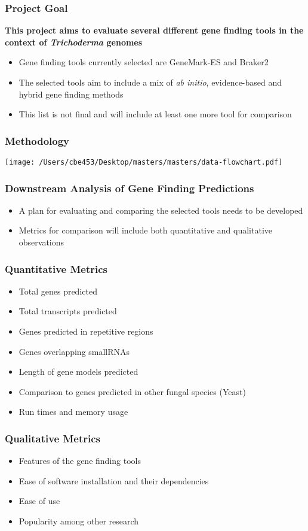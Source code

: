 \documentclass{beamer}
\begin{document}
\begin{frame}
  \frametitle{Project Goal} \textbf{This project aims to evaluate
    several different gene finding tools in the context of
    \textit{Trichoderma} genomes}
  \begin{itemize}
    \item Gene finding tools currently selected are GeneMark-ES and
      Braker2
    \item The selected tools aim to include a mix of \textit{ab
      initio}, evidence-based and hybrid gene finding methods
    \item This list is not final and will include at least one more
      tool for comparison
  \end{itemize}
\end{frame}

\begin{frame}
  \frametitle{Methodology}
  \begin{center}
    \texttt{[image: /Users/cbe453/Desktop/masters/masters/data-flowchart.pdf]}
  \end{center}
\end{frame}

\begin{frame}
  \frametitle{Downstream Analysis of Gene Finding Predictions}
  \begin{itemize}
   \item A plan for evaluating and comparing the selected tools needs
     to be developed
   \item Metrics for comparison will include both quantitative and
     qualitative observations

  \end{itemize}
\end{frame}

\begin{frame}

 \frametitle{Quantitative Metrics}
  \begin{itemize}
  \item Total genes predicted
  \item Total transcripts predicted
  \item Genes predicted in repetitive regions
  \item Genes overlapping smallRNAs
  \item Length of gene models predicted
  \item Comparison to genes predicted in other fungal species (Yeast)
  \item Run times and memory usage
  \end{itemize}
\end{frame}

\begin{frame}
  \frametitle{Qualitative Metrics}
  \begin{itemize}
  \item Features of the gene finding tools
  \item Ease of software installation and their dependencies
  \item Ease of use
  \item Popularity among other research
  \end{itemize}
\end{frame}
\end{document}
